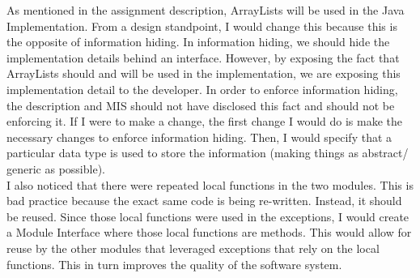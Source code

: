 \documentclass[12pt]{article}
\begin{document}
As mentioned in the assignment description, ArrayLists will be used in the Java Implementation. From a design standpoint, I would change this because this is the opposite
of information hiding. In information hiding, we should hide the implementation details behind an interface. However, by exposing the fact that ArrayLists should and will be
used in the implementation, we are exposing this implementation detail to the developer. In order to enforce information hiding, the description and MIS should not have
disclosed this fact and should not be enforcing it. If I were to make a change, the first change I would do is make the necessary changes to enforce information hiding. Then,
I would specify that a particular data type is used to store the information (making things as abstract/ generic as possible).\\


I also noticed that there were repeated local functions in the two modules. This is bad practice because the exact same
code is being re-written. Instead, it should be reused. Since those local functions were used in the exceptions, I would
create a Module Interface where those local functions are methods. This would allow for reuse by the other modules that leveraged
exceptions that rely on the local functions. This in turn improves the quality of the software system. \\
\end{document}
